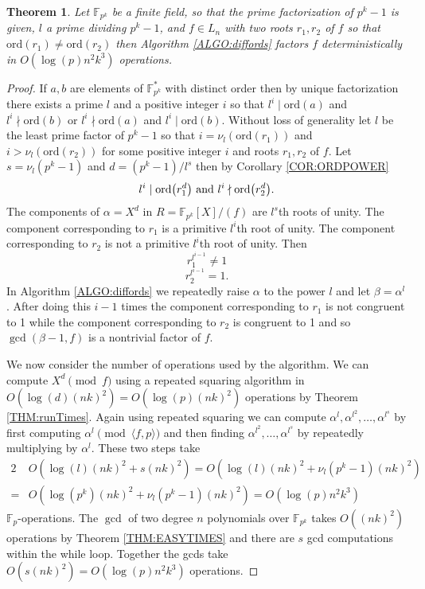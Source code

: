 \documentclass{article}
\let\originalleft\left
\let\originalright\right
\renewcommand{\left}{\mathopen{}\mathclose\bgroup\originalleft}
\renewcommand{\right}{\aftergroup\egroup\originalright}
\newcounter{dummy} \numberwithin{dummy}{section}
\theoremstyle{plain}
\newtheorem{thm}[dummy]{Theorem}
\theoremstyle{definition}
\def\Fp {{ \mathbb{F} _ {p} }}
\def\FpE {{ \mathbb{F} _ {p^k} }}
\def\FPE {{ \mathbb{F}^* _ {p^k} }}
\def\ord {{ \mathrm{ord} }}
\begin{document}
		\begin{thm}
		\label{THM:diffOrds}
				Let $\FpE$ be a finite field, so that the prime factorization of $p^k-1$ is given, $l$ a prime dividing $p^k-1$, and $f \in L_n$ with two roots $r_1,r_2$ of $f$ so that  $\ord(r_1) \neq \ord(r_2)$ then Algorithm \ref{ALGO:diffords} factors $f$ deterministically in $O(\log(p)n^2k^3)$ operations. 
		\end{thm}

		\begin{proof} 
				If $a,b$ are elements of $\FPE$ with distinct order then by unique factorization there exists a prime $l$ and a positive integer $i$ so that $l^i \mid \ord(a)$ and $l^i \nmid \ord(b)$ or $l^i \nmid \ord(a)$ and $l^i \mid \ord(b)$. Without loss of generality let $l$ be the least prime factor of $p^k-1$ so that $i=\nu_l(\ord(r_1))$ and $i > \nu_l(\ord(r_2))$ for some positive integer $i$ and roots $r_1,r_2$ of $f$. Let $s=\nu_l(p^k-1)$ and $d=(p^k-1)/l^s$ then by Corollary \ref{COR:ORDPOWER}
				\[ l^i \mid \ord \left( r_1^d \right) \textrm{ and } l^i \nmid \ord \left( r_2^d \right). \]
				The components of $\alpha=X^d$ in $R=\FpE[X]/(f)$ are $l^s$th roots of unity. The component corresponding to $r_1$ is a primitive $l^i$th root of unity. The component corresponding to $r_2$ is not a primitive $l^i$th root of unity. Then 
				    \[ r_1^{l^{i-1}} \not= 1 \]
				    \[ r_2^{l^{i-1}} = 1. \]
				In Algorithm \ref{ALGO:diffords} we repeatedly raise $\alpha$ to the power $l$ and let $\beta=\alpha^l$. After doing this $i-1$ times the component corresponding to $r_1$ is not congruent to 1 while the component corresponding to $r_2$ is congruent to 1 and so $\gcd(\beta-1,f)$ is a nontrivial factor of $f$. 
						
				We now consider the number of operations used by the algorithm. We can compute $X^d \pmod f$ using a repeated squaring algorithm in $O(\log(d)(nk)^2)=O(\log(p)(nk)^2)$ operations by Theorem \ref{THM:runTimes}. Again using repeated squaring we can compute $\alpha^l, \alpha^{l^2},\ldots,\alpha^{l^s}$ by first computing $\alpha^l \pmod {\langle f,p \rangle}$ and then finding $\alpha^{l^2},\ldots,\alpha^{l^s}$ by repeatedly multiplying by $\alpha^l$. These two steps take  
				\begin{alignat*}{2}
				    &O(\log(l)(nk)^2+s(nk)^2)=O(\log(l)(nk)^2+\nu_l(p^k-1)(nk)^2) \\
				   =&O(\log(p^k)(nk)^2+\nu_l(p^k-1)(nk)^2)=O(\log(p)n^2k^3)  
			  \end{alignat*}
				$\Fp$-operations. The $\gcd$ of two degree $n$ polynomials over $\FpE$ takes $O((nk)^2)$ operations by Theorem \ref{THM:EASYTIMES} and there are $s$ gcd computations within the while loop. Together the gcds take $O(s(nk)^2)=O(\log(p)n^2k^3)$ operations. 
		\end{proof}
		
\end{document}
